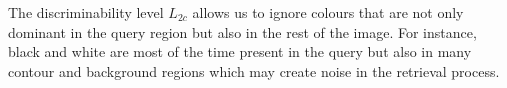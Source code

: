 The discriminability level $L_{2c}$ allows us to ignore colours that are not only dominant in the query region but also in the rest of the image.
For instance, black and white are most of the time present in the query but also in many contour and background regions which may create noise in the retrieval process.







